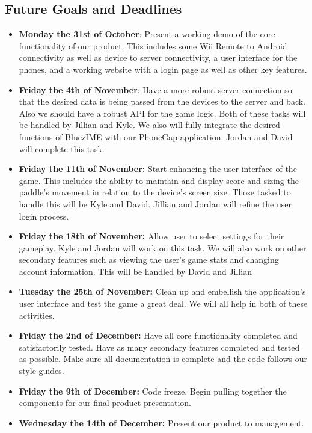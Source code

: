 \documentclass[12pt]{article}
\begin{document}
\subsection{Future Goals and Deadlines}
\begin{itemize}
\item \textbf{Monday the 31st of October}: Present a working demo of the core functionality of our product.  This includes some Wii Remote to Android connectivity as well as device to server connectivity, a user interface for the phones, and a working website with a login page as well as other key features.

\item \textbf{Friday the 4th of November}: Have a more robust server connection so that the desired data is being passed from the devices to the server and back.  Also we should have a robust API for the game logic.  Both of these tasks will be handled by Jillian and Kyle.  We also will fully integrate the desired functions of BluezIME with our PhoneGap application.  Jordan and David will complete this task.

\item \textbf{Friday the 11th of November:} Start enhancing the user interface of the game.  This includes the ability to maintain and display score and sizing the paddle’s movement in relation to the device’s screen size.  Those tasked to handle this will be Kyle and David.  Jillian and Jordan will refine the user login process.

\item \textbf{Friday the 18th of November:} Allow user to select settings for their gameplay.  Kyle and Jordan will work on this task. We will also work on other secondary features such as viewing the user’s game stats and changing account information.  This will be handled by David and Jillian

\item \textbf{Tuesday the 25th of November:} Clean up and embellish the application’s user interface and test the game a great deal.  We will all help in both of these activities. 

\item \textbf{Friday the 2nd of December:} Have all core functionality completed and satisfactorily tested.  Have as many secondary features completed and tested as possible.  Make sure all documentation is complete and the code follows our style guides. 

\item \textbf{Friday the 9th of December:} Code freeze.  Begin pulling together the components for our final product presentation.

\item \textbf{Wednesday the 14th of December:}  Present our product to management.
\end{itemize}



\newpage


\end{document}
